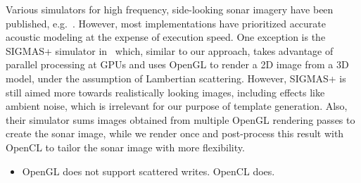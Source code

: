 \documentclass[12pt,journal,draftclsnofoot,onecolumn]{IEEEtran}
\newcommand\1{\vec 1}
\begin{document}
Various simulators for high frequency, side-looking sonar imagery have been published, e.g.~\cite{Bell1997,Sammelm2003}. However, most implementations have prioritized accurate acoustic modeling at the expense of execution speed. One exception is the SIGMAS+ simulator in~\cite{Coiras2009a, Coiras2009b} which, similar to our approach, takes advantage of parallel processing at GPUs and uses OpenGL to render a 2D image from a 3D model, under the assumption of Lambertian scattering. However, SIGMAS+ is still aimed more towards realistically looking images, including effects like ambient noise, which is irrelevant for our purpose of template generation. Also, their simulator sums images obtained from multiple OpenGL rendering passes to create the sonar image, while we render once and post-process this result with OpenCL to tailor the sonar image with more flexibility.

\begin{itemize}
\item OpenGL does not support scattered writes. OpenCL does.
\end{itemize}



% 
\end{document}
